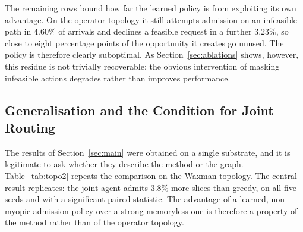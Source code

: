 \documentclass[10pt,journal,comsoc]{IEEEtran}
\begin{document}
The remaining rows bound how far the learned policy is from exploiting
its own advantage. On the operator topology it still attempts admission
on an infeasible path in $4.60\%$ of arrivals and declines a feasible
request in a further $3.23\%$, so close to eight percentage points of the
opportunity it creates go unused. The policy is therefore clearly
suboptimal. As Section~\ref{sec:ablations} shows, however, this residue
is not trivially recoverable: the obvious intervention of masking
infeasible actions degrades rather than improves performance.

\subsection{Generalisation and the Condition for Joint Routing}
\label{sec:generalization}
The results of Section~\ref{sec:main} were obtained on a single
substrate, and it is legitimate to ask whether they describe the method
or the graph. Table~\ref{tab:topo2} repeats the comparison on the Waxman
topology. The central result replicates: the joint agent admits $3.8\%$
more slices than greedy, on all five seeds and with a significant
paired statistic. The advantage of a learned, non-myopic admission
policy over a strong memoryless one is therefore a property of the
method rather than of the operator topology.
\end{document}
